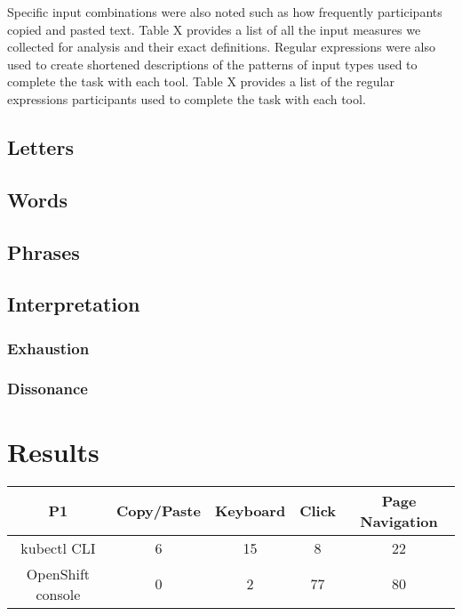 \documentclass[11pt, oneside]{article}   	%
\begin{document}
Specific input combinations were also noted such as how frequently participants copied and pasted text. Table X provides a list of all the input measures we collected for analysis and their exact definitions. Regular expressions were also used to create shortened descriptions of the patterns of input types used to complete the task with each tool. Table X provides a list of the regular expressions participants used to complete the task with each tool. 

\subsection{Letters}
\subsection{Words}
\subsection{Phrases}
\subsection{Interpretation}
\subsubsection{Exhaustion}
\subsubsection{Dissonance}

\section{Results}


\begin{center}
\begin{tabular}{ | c | c | c | c | c | } 
  \hline
  P1 & Copy/Paste & Keyboard & Click & Page Navigation \\ 
  \hline
  kubectl CLI & 6 & 15 & 8 & 22 \\ 
  \hline
  OpenShift console & 0 & 2 & 77 & 80 \\ 
  \hline
\end{tabular}
\end{center}
\end{document}
